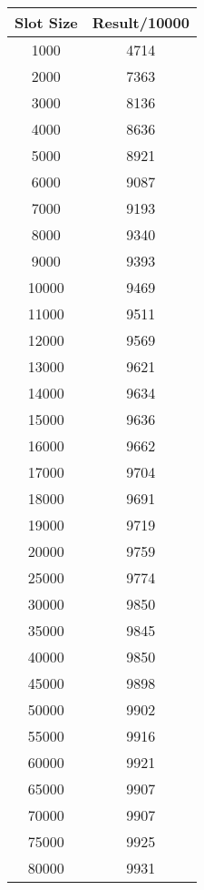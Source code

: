 \documentclass[a4paper]{article}
\begin{document}
\begin{center}
	\begin{longtable}{ |c|c| }
	\hline 
	\textbf{Slot Size} & \textbf{Result/10000} \\ \hline
	1000 & 4714 \\
	2000 & 7363 \\
	3000 & 8136 \\
	4000 & 8636 \\
	5000 & 8921 \\
	6000 & 9087 \\
	7000 & 9193 \\
	8000 & 9340 \\
	9000 & 9393 \\
	10000 & 9469 \\
	11000 & 9511 \\
	12000 & 9569 \\
	13000 & 9621 \\
	14000 & 9634 \\
	15000 & 9636 \\
	16000 & 9662 \\
	17000 & 9704 \\
	18000 & 9691 \\
	19000 & 9719 \\
	20000 & 9759 \\ \hline
	25000 & 9774 \\
	30000 & 9850 \\
	35000 & 9845 \\
	40000 & 9850 \\
	45000 & 9898 \\
	50000 & 9902 \\
	55000 & 9916 \\
	60000 & 9921 \\
	65000 & 9907 \\
	70000 & 9907 \\
	75000 & 9925 \\
	80000 & 9931 \\ \hline
    \end{longtable}
\end{center}
   	
\end{document}
